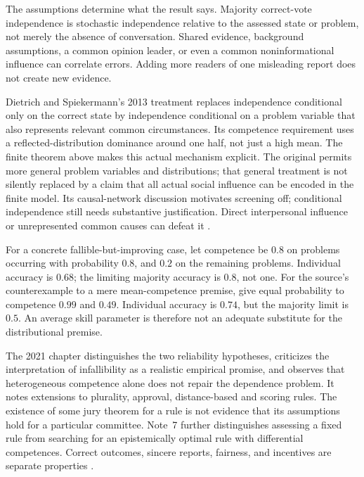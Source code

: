 The assumptions determine what the result says. Majority correct-vote
independence is stochastic independence relative to the assessed state
or problem, not merely the absence of conversation. Shared evidence,
background assumptions, a common opinion leader, or even a common
noninformational influence can correlate errors. Adding more readers
of one misleading report does not create new evidence.

Dietrich and Spiekermann's 2013 treatment replaces independence
conditional only on the correct state by independence conditional on a
problem variable that also represents relevant common circumstances.
Its competence requirement uses a reflected-distribution dominance
around one half, not just a high mean. The finite theorem above makes
this actual mechanism explicit. The original permits more general
problem variables and distributions; that general treatment is not
silently replaced by a claim that all actual social influence can be
encoded in the finite model. Its causal-network discussion motivates
screening off; conditional independence still needs substantive
justification. Direct interpersonal influence or unrepresented common
causes can defeat it
\parencite[pp.~94--103]{DietrichSpiekermann2013Defensible}.

For a concrete fallible-but-improving case, let competence be \(0.8\)
on problems occurring with probability \(0.8\), and \(0.2\) on the
remaining problems. Individual accuracy is \(0.68\); the limiting
majority accuracy is \(0.8\), not one. For the source's counterexample
to a mere mean-competence premise, give equal probability to competence
\(0.99\) and \(0.49\). Individual accuracy is \(0.74\), but the
majority limit is \(0.5\). An average skill parameter is therefore
not an adequate substitute for the distributional premise.

The 2021 chapter distinguishes the two reliability hypotheses, criticizes
the interpretation of infallibility as a realistic empirical promise,
and observes that heterogeneous competence alone does not repair the
dependence problem. It notes extensions to plurality, approval,
distance-based and scoring rules. The existence of some jury theorem
for a rule is not evidence that its assumptions hold for a particular
committee. Note~7 further distinguishes assessing a fixed rule from
searching for an epistemically optimal rule with differential
competences. Correct outcomes, sincere reports, fairness, and incentives
are separate properties
\parencite[pp.~583--584 and n.~7, p.~587]{DietrichSpiekermann2021Social}.

